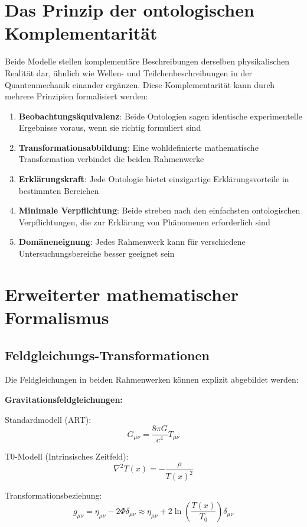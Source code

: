 \documentclass[12pt,a4paper]{article}
\newcommand{\Tfield}{T(x)}
\newcommand{\Tzero}{T_0}
\begin{document}
	\section{Das Prinzip der ontologischen Komplementarität}
	
	Beide Modelle stellen komplementäre Beschreibungen derselben physikalischen Realität dar, ähnlich wie Wellen- und Teilchenbeschreibungen in der Quantenmechanik einander ergänzen. Diese Komplementarität kann durch mehrere Prinzipien formalisiert werden:
	
	\begin{enumerate}
		\item \textbf{Beobachtungsäquivalenz}: Beide Ontologien sagen identische experimentelle Ergebnisse voraus, wenn sie richtig formuliert sind
		\item \textbf{Transformationsabbildung}: Eine wohldefinierte mathematische Transformation verbindet die beiden Rahmenwerke
		\item \textbf{Erklärungskraft}: Jede Ontologie bietet einzigartige Erklärungsvorteile in bestimmten Bereichen
		\item \textbf{Minimale Verpflichtung}: Beide streben nach den einfachsten ontologischen Verpflichtungen, die zur Erklärung von Phänomenen erforderlich sind
		\item \textbf{Domäneneignung}: Jedes Rahmenwerk kann für verschiedene Untersuchungsbereiche besser geeignet sein
	\end{enumerate}
	
	\section{Erweiterter mathematischer Formalismus}
	
	\subsection{Feldgleichungs-Transformationen}
	
	Die Feldgleichungen in beiden Rahmenwerken können explizit abgebildet werden:
	
	\textbf{Gravitationsfeldgleichungen:}
	
	Standardmodell (ART):
	\[ G_{\mu\nu} = \frac{8\pi G}{c^4} T_{\mu\nu} \]
	
	T0-Modell (Intrinsisches Zeitfeld):
	\[ \nabla^2 \Tfield = -\frac{\rho}{\Tfield^2} \]
	
	Transformationsbeziehung:
	\[ g_{\mu\nu} = \eta_{\mu\nu} - 2\Phi \delta_{\mu\nu} \approx \eta_{\mu\nu} + 2 \ln\left( \frac{\Tfield}{\Tzero} \right) \delta_{\mu\nu} \]
	
\end{document}
